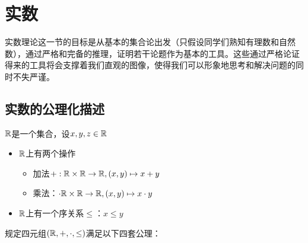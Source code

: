 \section{实数}

实数理论这一节的目标是从基本的集合论出发（只假设同学们熟知有理数和⾃然数），通过严格和完备的推理，证明若干论题作为基本的工具。这些通过严格论证得来的工具将会⽀撑着我们直观的图像，使得我们可以形象地思考和解决问题的同时不失严谨。

\subsection{实数的公理化描述}

$\mathbb{R}$是一个集合，设$x,y,z\in \mathbb{R}$

\begin{itemize}
    \item $\mathbb{R}$上有两个操作
    
    \begin{itemize}
        \item 加法$+:\mathbb{R} \times \mathbb{R} \rightarrow \mathbb{R},(x,y)\mapsto x+y$
        \item 乘法：$\cdot \mathbb{R}\times\mathbb{R}\rightarrow\mathbb{R},(x,y)\mapsto x\cdot y$
    \end{itemize}

    \item $\mathbb{R}$上有一个序关系$\leq$：$x\leq y$
\end{itemize}

规定四元组$(\mathbb{R},+,\cdot,\leq)$满足以下四套公理：

